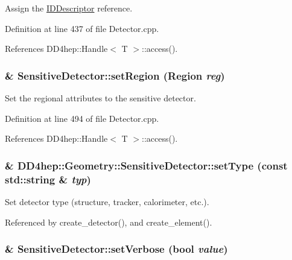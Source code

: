 Assign the \hyperlink{class_d_d4hep_1_1_geometry_1_1_i_d_descriptor}{IDDescriptor} reference. 

Definition at line 437 of file Detector.cpp.

References DD4hep::Handle$<$ T $>$::access().\hypertarget{class_d_d4hep_1_1_geometry_1_1_sensitive_detector_a3fafb658e1cc5dbe7a1683e5420cce46}{
\subsubsection[{setRegion}]{ \& SensitiveDetector::setRegion ({\bf Region} {\em reg})}}
\label{class_d_d4hep_1_1_geometry_1_1_sensitive_detector_a3fafb658e1cc5dbe7a1683e5420cce46}


Set the regional attributes to the sensitive detector. 

Definition at line 494 of file Detector.cpp.

References DD4hep::Handle$<$ T $>$::access().\hypertarget{class_d_d4hep_1_1_geometry_1_1_sensitive_detector_a1e0205afa22a576ecf2f5410d75fa952}{
\subsubsection[{setType}]{\& DD4hep::Geometry::SensitiveDetector::setType (const std::string \& {\em typ})}}
\label{class_d_d4hep_1_1_geometry_1_1_sensitive_detector_a1e0205afa22a576ecf2f5410d75fa952}


Set detector type (structure, tracker, calorimeter, etc.). 

Referenced by create\_\-detector(), and create\_\-element().\hypertarget{class_d_d4hep_1_1_geometry_1_1_sensitive_detector_ae6c42b0c547eb06bddfd84c27a5b9e87}{
\subsubsection[{setVerbose}]{ \& SensitiveDetector::setVerbose (bool {\em value})}}
\label{class_d_d4hep_1_1_geometry_1_1_sensitive_detector_ae6c42b0c547eb06bddfd84c27a5b9e87}


